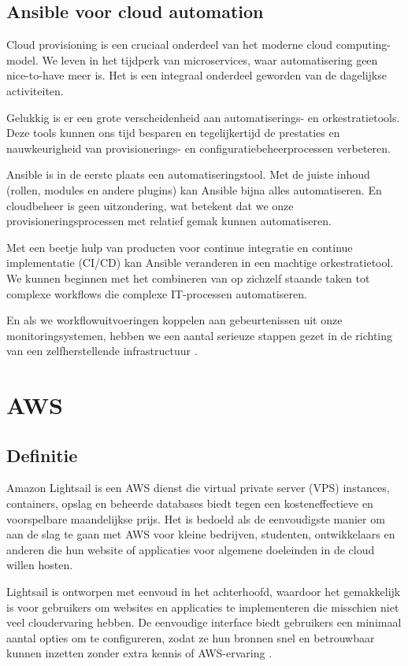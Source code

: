 \subsection{Ansible voor cloud automation}
\label{Ansible voor cloud automation}
Cloud provisioning is een cruciaal onderdeel van het moderne cloud computing-model. 
We leven in het tijdperk van microservices, waar automatisering geen nice-to-have meer is. 
Het is een integraal onderdeel geworden van de dagelijkse activiteiten.
\par
Gelukkig is er een grote verscheidenheid aan automatiserings- en orkestratietools. 
Deze tools kunnen ons tijd besparen en tegelijkertijd de prestaties en nauwkeurigheid van provisionerings- en 
configuratiebeheerprocessen verbeteren.
\par
Ansible is in de eerste plaats een automatiseringstool. Met de juiste inhoud (rollen, modules en andere plugins) kan Ansible bijna 
alles automatiseren. En cloudbeheer is geen uitzondering, wat betekent dat we onze provisioneringsprocessen met relatief gemak 
kunnen automatiseren.
\par
Met een beetje hulp van producten voor continue integratie en continue implementatie (CI/CD) kan Ansible veranderen in een 
machtige orkestratietool. We kunnen beginnen met het combineren van op zichzelf staande taken tot complexe workflows die 
complexe IT-processen automatiseren.
\par
En als we workflowuitvoeringen koppelen aan gebeurtenissen uit onze monitoringsystemen, 
hebben we een aantal serieuze stappen gezet in de richting van een zelfherstellende infrastructuur
\autocite{Borovšak2021}.

\section{AWS}
  \subsection{Definitie}
\label{Definitie}
Amazon Lightsail is een AWS dienst die virtual private server (VPS) instances, containers, opslag en beheerde databases biedt 
tegen een kosteneffectieve en voorspelbare maandelijkse prijs. Het is bedoeld als de eenvoudigste manier om aan de slag te 
gaan met AWS voor kleine bedrijven, studenten, ontwikkelaars en anderen die hun website of applicaties voor algemene doeleinden 
in de cloud willen hosten.
\par
Lightsail is ontworpen met eenvoud in het achterhoofd, waardoor het gemakkelijk is voor gebruikers om websites en 
applicaties te implementeren die misschien niet veel cloudervaring hebben. De eenvoudige interface biedt gebruikers een 
minimaal aantal opties om te configureren, zodat ze hun bronnen snel en betrouwbaar kunnen inzetten zonder extra kennis of 
AWS-ervaring
\autocite{Graf2022}.

